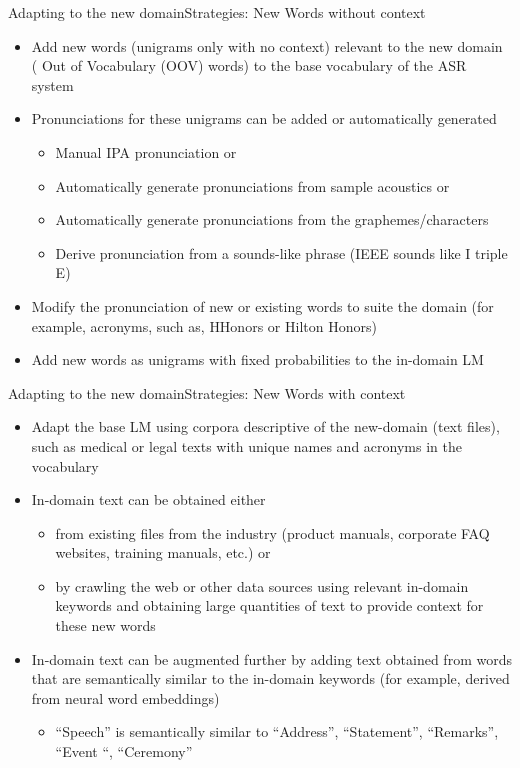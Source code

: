 \begin{frame}{Adapting to the new domain}{Strategies: New Words without context}

\begin{itemize}
\item Add new words (unigrams only with no context) relevant to the new domain ({\color{red} Out of Vocabulary} (OOV) words) to the base vocabulary of the ASR system
\item Pronunciations for these unigrams can be added or automatically generated

\begin{itemize}
\item Manual IPA pronunciation or
\item Automatically generate pronunciations from sample acoustics or
\item Automatically generate pronunciations from the graphemes/characters
\item Derive pronunciation from a sounds-like phrase (IEEE sounds like {\color{red} I triple E})
\end{itemize}

\item Modify  the pronunciation of new or existing words to suite the domain (for example, acronyms, such as, {\color{blue} HHonors} or {\color{blue} Hilton Honors})
\item  Add new words as unigrams with fixed probabilities to the {\color{blue} in-domain LM}
\end{itemize}
\end{frame}

\begin{frame}{Adapting to the new domain}{Strategies: New Words with context}

\begin{itemize}
\item Adapt the base LM using  corpora descriptive of the new-domain (text files), such as medical or legal texts with unique names and acronyms in the vocabulary
\item  In-domain text can be obtained either
\begin{itemize}
\item from existing files from the industry (product manuals, corporate FAQ websites, training manuals, etc.) or
\item by crawling the web or other data sources using relevant {\color{red} in-domain keywords} and obtaining large quantities of text to provide context for these new words
\end{itemize}
\item In-domain text can be augmented further by adding text obtained from words that are semantically similar to the in-domain keywords (for example, derived from neural word embeddings)
\begin{itemize}
\item {\color{blue} ``Speech''} is semantically similar to ``Address'', ``Statement'', ``Remarks'', ``Event ``, ``Ceremony''
\end{itemize}
\end{itemize}

\end{frame}

